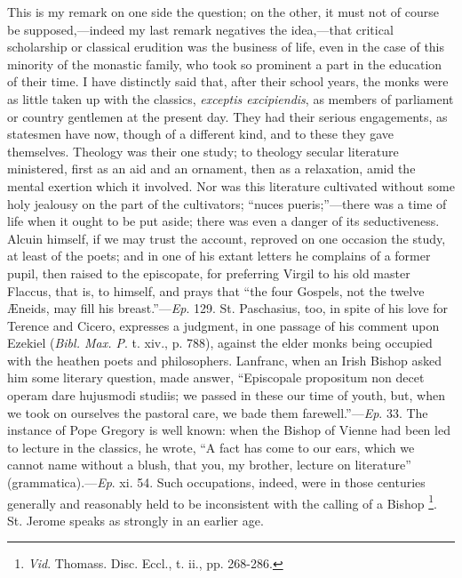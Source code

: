 This is my remark on one side the question; on the other, it must
not of course be supposed,—indeed my last remark negatives the idea,—that
critical scholarship or classical erudition was the business of life,
even in the case of this minority of the monastic family, who took so
prominent a part in the education of their time. I have distinctly
said that, after their school years, the monks were as little taken up
with the classics, \emph{exceptis excipiendis}, as members of
parliament or country gentlemen at the present day. They had their
serious engagements, as statesmen have now, though of a
different kind, and to these they gave themselves. Theology was their
one study; to theology secular literature ministered, first as an aid
and an ornament, then as a relaxation, amid the mental exertion which
it involved. Nor was this literature cultivated without some holy
jealousy on the part of the cultivators; ``nuces pueris;''—there
was a time of life when it ought to be put aside; there was even a
danger of its seductiveness. Alcuin himself, if we may trust the
account, reproved on one occasion the study, at least of the poets;
and in one of his extant letters he complains of a former pupil, then
raised to the episcopate, for preferring Virgil to his old master
Flaccus, that is, to himself, and prays that ``the four Gospels,
not the twelve Æneids, may fill his breast.''—\emph{Ep}. 129.
St. Paschasius, too, in spite of his love for Terence and Cicero,
expresses a judgment, in one passage of his comment upon Ezekiel (\emph{Bibl.
Max. P}. t. xiv., p. 788), against the elder monks being occupied
with the heathen poets and philosophers. Lanfranc, when an Irish
Bishop asked him some literary question, made answer, ``Episcopale
propositum non decet operam dare hujusmodi studiis; we passed in these
our time of youth, but, when we took on ourselves the pastoral care,
we bade them farewell.''—\emph{Ep}. 33. The instance of Pope
Gregory is well known: when the Bishop of Vienne had been led to
lecture in the classics, he wrote, ``A fact has come to our ears,
which we cannot name without a blush, that you, my brother, lecture on
literature'' (grammatica).—\emph{Ep}. xi. 54. Such occupations,
indeed, were in those centuries generally and reasonably held to be
inconsistent with the calling of a Bishop \footnote{\emph{Vid}.
Thomass. Disc. Eccl., t. ii., pp. 268-286.}. St. Jerome speaks as strongly in an earlier age.

